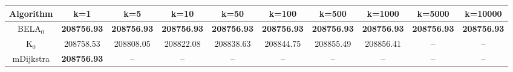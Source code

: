 \begin{tabular}{c|ccccccccc}\toprule
Algorithm & k=1 & k=5 & k=10 & k=50 & k=100 & k=500 & k=1000 & k=5000 & k=10000 \\ \midrule
BELA$_0$ & \textbf{208756.93} & \textbf{208756.93} & \textbf{208756.93} & \textbf{208756.93} & \textbf{208756.93} & \textbf{208756.93} & \textbf{208756.93} & \textbf{208756.93} & \textbf{208756.93} \\
K$_0$ & 208758.53 & 208808.05 & 208822.08 & 208838.63 & 208844.75 & 208855.49 & 208856.41 & -- & -- \\
mDijkstra & \textbf{208756.93} & -- & -- & -- & -- & -- & -- & -- & -- \\ \bottomrule 
\end{tabular}
